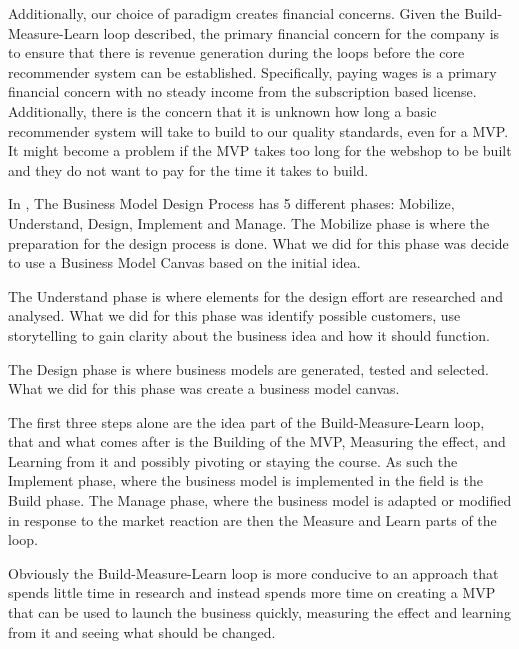 Additionally, our choice of paradigm creates financial concerns. 
Given the Build-Measure-Learn loop described, the primary financial concern for the company is to ensure that there is revenue generation during the loops before the core recommender system can be established. 
Specifically, paying wages is a primary financial concern with no steady income from the subscription based license. 
Additionally, there is the concern that it is unknown how long a basic recommender system will take to build to our quality standards, even for a MVP.
It might become a problem if the MVP takes too long for the webshop to be built and they do not want to pay for the time it takes to build.

In \citet[pg. 241-261]{osterwalder2010business}, The Business Model Design Process has 5 different phases: Mobilize, Understand, Design, Implement and Manage.
The Mobilize phase is where the preparation for the design process is done.
What we did for this phase was decide to use a Business Model Canvas based on the initial idea.

The Understand phase is where elements for the design effort are researched and analysed. 
What we did for this phase was identify possible customers, use storytelling to gain clarity about the business idea and how it should function.

The Design phase is where business models are generated, tested and selected.
What we did for this phase was create a business model canvas.

The first three steps alone are the idea part of the Build-Measure-Learn loop, that and what comes after is the Building of the MVP, Measuring the effect, and Learning from it and possibly pivoting or staying the course. 
As such the Implement phase, where the business model is implemented in the field is the Build phase.
The Manage phase, where the business model is adapted or modified in response to the market reaction are then the Measure and Learn parts of the loop.

Obviously the Build-Measure-Learn loop is more conducive to an approach that spends little time in research and instead spends more time on creating a MVP that can be used to launch the business quickly, measuring the effect and learning from it and seeing what should be changed.

%
